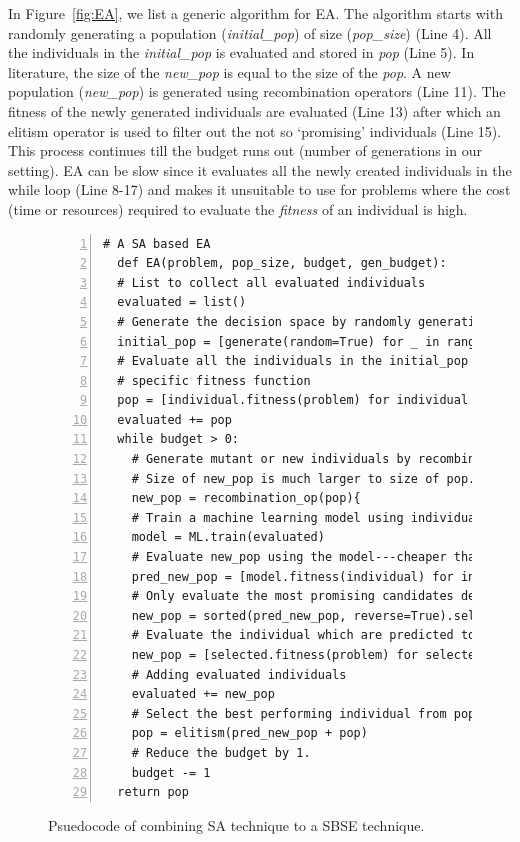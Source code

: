 \documentclass[table, xcdraw, sigconf,review, anonymous]{acmart}
\begin{document}
In Figure~\ref{fig:EA},  we list a generic algorithm for EA. The algorithm starts with randomly generating a population (\textit{initial\_pop}) of size (\textit{pop\_size}) (Line 4). All the individuals in the \textit{initial\_pop} is evaluated and stored in \textit{pop} (Line 5). In literature, the size of the \textit{new\_pop} is equal to the size of the \textit{pop}. A new population (\textit{new\_pop}) is generated using recombination operators (Line 11). The fitness of the newly generated individuals are evaluated (Line 13) after which an elitism operator is used to filter out the not so `promising' individuals (Line 15).  This process continues till the budget runs out (number of generations in our setting).
EA can be slow since it evaluates all the newly created individuals in the while loop (Line 8-17) and makes it unsuitable to use for problems where the cost (time or resources) required to evaluate the \textit{fitness} of an individual is high.

\begin{figure}[t]
\small
\hspace{0.4cm}
\begin{lstlisting}[xleftmargin=5.0ex,mathescape,frame=none,numbers=left,linebackgroundcolor={%
        \ifnum\value{lstnumber}>11
            \ifnum\value{lstnumber}<25
                \color{gray!25}
            \fi
        \fi},autogobble=true,]
  # A SA based EA
  def EA(problem, pop_size, budget, gen_budget):
  # List to collect all evaluated individuals
  evaluated = list()
  # Generate the decision space by randomly generating solutions
  initial_pop = [generate(random=True) for _ in range(pop_size)]
  # Evaluate all the individuals in the initial_pop using problem 
  # specific fitness function
  pop = [individual.fitness(problem) for individual in initial_pop]
  evaluated += pop
  while budget > 0:
    # Generate mutant or new individuals by recombining individuals from pop.
    # Size of new_pop is much larger to size of pop.
    new_pop = recombination_op(pop){
    # Train a machine learning model using individuals from pop 
    model = ML.train(evaluated)
    # Evaluate new_pop using the model---cheaper than individual.fitness 
    pred_new_pop = [model.fitness(individual) for individual in new_pop]
    # Only evaluate the most promising candidates defined by gen_budget
    new_pop = sorted(pred_new_pop, reverse=True).select(gen_budget)
    # Evaluate the individual which are predicted to be promising
    new_pop = [selected.fitness(problem) for selected in new_pop]
    # Adding evaluated individuals
    evaluated += new_pop
    # Select the best performing individual from pop + new_pop
    pop = elitism(pred_new_pop + pop)
    # Reduce the budget by 1. 
    budget -= 1
  return pop

\end{lstlisting}
\caption{\small{Psuedocode of combining SA technique to a SBSE technique.}
}
\label{fig:SAEA}  
\end{figure}
\end{document}
